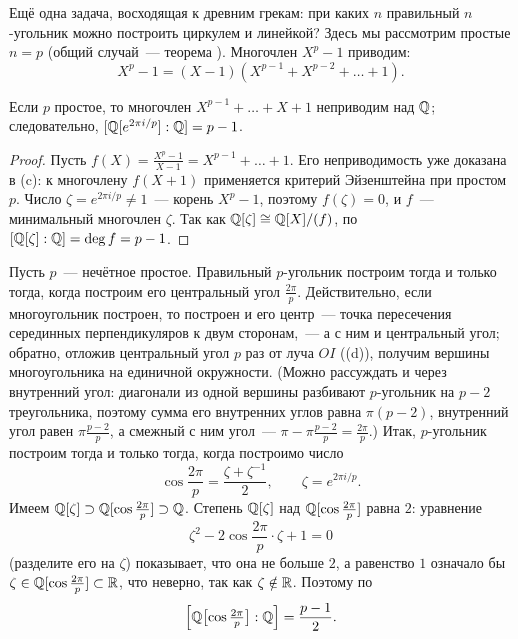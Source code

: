 Ещё одна задача, восходящая к древним грекам: при каких $n$ правильный $n$-угольник можно построить циркулем и
линейкой? Здесь мы рассмотрим простые $n=p$ (общий случай~--- теорема ). Многочлен $X^p-1$ приводим:
\[
X^p-1=(X-1)(X^{p-1}+X^{p-2}+\dots+1).
\]

\begin{lemma}[1.42]
Если $p$ простое, то многочлен $X^{p-1}+\dots+X+1$ неприводим над $\mathbb Q$; следовательно, $[\mathbb Q[e^{2\pi i/p}]:\mathbb Q]=p-1$.
\end{lemma}

\begin{proof}
Пусть $f(X)=\frac{X^p-1}{X-1}=X^{p-1}+\dots+1$. Его неприводимость уже доказана в (c): к многочлену $f(X+1)$
применяется критерий Эйзенштейна  при простом $p$. Число
$\zeta=e^{2\pi i/p}\ne1$~--- корень $X^p-1$, поэтому $f(\zeta)=0$, и $f$~--- минимальный многочлен $\zeta$. Так как $\mathbb Q[\zeta]\cong\mathbb Q[X]/(f)$,
по  $[\mathbb Q[\zeta]:\mathbb Q]=\deg f=p-1$.
\end{proof}

Пусть $p$~--- нечётное простое. Правильный $p$-угольник построим тогда и только тогда, когда построим его центральный
угол $\frac{2\pi}p$. Действительно, если многоугольник построен, то построен и его центр~--- точка пересечения
серединных перпендикуляров к двум сторонам,~--- а с ним и центральный угол; обратно, отложив центральный угол $p$ раз
от луча $OI$ ((d)), получим вершины многоугольника на единичной окружности. (Можно рассуждать и через
внутренний угол: диагонали из одной вершины разбивают $p$-угольник на $p-2$ треугольника, поэтому сумма его
внутренних углов равна $\pi(p-2)$, внутренний угол равен $\pi\frac{p-2}p$, а смежный с ним угол~---
$\pi-\pi\frac{p-2}p=\frac{2\pi}p$.) Итак, $p$-угольник построим тогда и только тогда, когда построимо число
\[
\cos\frac{2\pi}p=\frac{\zeta+\zeta^{-1}}2,\qquad \zeta=e^{2\pi i/p}.
\]
Имеем $\mathbb Q[\zeta]\supset\mathbb Q[\cos\frac{2\pi}p]\supset\mathbb Q$. Степень $\mathbb Q[\zeta]$ над $\mathbb Q[\cos\frac{2\pi}p]$ равна $2$: уравнение
\[
\zeta^2-2\cos\frac{2\pi}p\cdot\zeta+1=0
\]
(разделите его на $\zeta$) показывает, что она не больше $2$, а равенство $1$ означало бы $\zeta\in\mathbb Q[\cos\frac{2\pi}p]\subset\mathbb R$,
что неверно, так как $\zeta\notin\mathbb R$. Поэтому по 
\[
\Bigl[\mathbb Q\bigl[\cos\tfrac{2\pi}p\bigr]:\mathbb Q\Bigr]=\frac{p-1}2 .
\]

